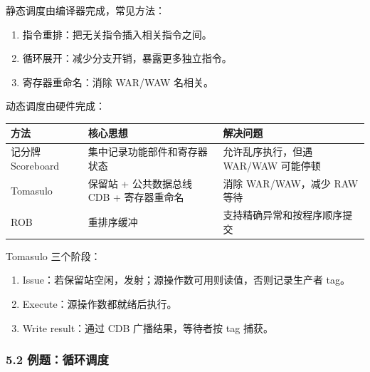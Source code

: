 \documentclass[
]{ctexart}
\newcounter{none} %
\providecommand{\tightlist}{%
  \setlength{\itemsep}{0pt}\setlength{\parskip}{0pt}}
\begin{document}
静态调度由编译器完成，常见方法：

\begin{enumerate}
\def\labelenumi{\arabic{enumi}.}
\tightlist
\item
  指令重排：把无关指令插入相关指令之间。
\item
  循环展开：减少分支开销，暴露更多独立指令。
\item
  寄存器重命名：消除 WAR/WAW 名相关。
\end{enumerate}

动态调度由硬件完成：

{\def\LTcaptype{none} %
\begin{longtable}[]{@{}
  >{\raggedright\arraybackslash}p{}
  >{\raggedright\arraybackslash}p{}
  >{\raggedright\arraybackslash}p{}@{}}
\toprule\noalign{}
\begin{minipage}[b]{\linewidth}\raggedright
方法
\end{minipage} & \begin{minipage}[b]{\linewidth}\raggedright
核心思想
\end{minipage} & \begin{minipage}[b]{\linewidth}\raggedright
解决问题
\end{minipage} \\
\midrule\noalign{}
\endhead
\bottomrule\noalign{}
\endlastfoot
记分牌 Scoreboard & 集中记录功能部件和寄存器状态 & 允许乱序执行，但遇
WAR/WAW 可能停顿 \\
Tomasulo & 保留站 + 公共数据总线 CDB + 寄存器重命名 & 消除 WAR/WAW，减少
RAW 等待 \\
ROB & 重排序缓冲 & 支持精确异常和按程序顺序提交 \\
\end{longtable}
}

Tomasulo 三个阶段：

\begin{enumerate}
\def\labelenumi{\arabic{enumi}.}
\tightlist
\item
  Issue：若保留站空闲，发射；源操作数可用则读值，否则记录生产者 tag。
\item
  Execute：源操作数都就绪后执行。
\item
  Write result：通过 CDB 广播结果，等待者按 tag 捕获。
\end{enumerate}

\subsubsection{5.2
例题：循环调度}\label{ux4f8bux9898ux5faaux73afux8c03ux5ea6}
\end{document}
